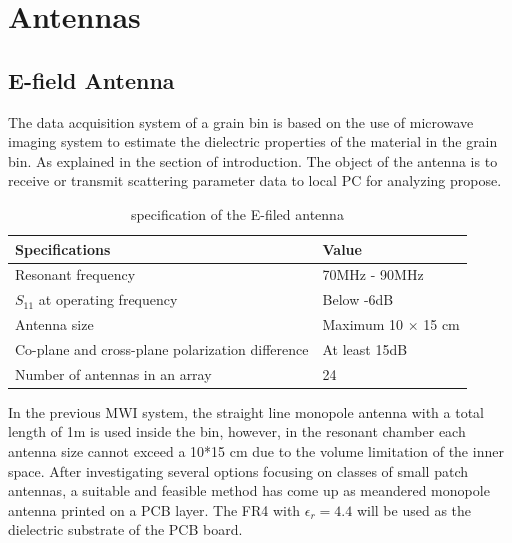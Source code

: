 
\chapter{Antennas}
\label{sec:Antennas}

\section{E-field Antenna}

The data acquisition system of a grain bin is based on the use of microwave imaging system to estimate the dielectric properties of the material in the grain bin. As explained in the section of introduction. The object of the antenna is to receive or transmit scattering parameter data to local PC for analyzing propose.

\begin{table}[h]
\centering
\caption{specification of the E-filed antenna}
\label{efield antenna specs}
\begin{tabular}{|l|l|}
\hline
Specifications                                   & Value              \\ \hline
Resonant frequency                               & 70MHz - 90MHz      \\ \hline
$S_{11}$ at operating frequency                       & Below -6dB         \\ \hline
Antenna size                                     & Maximum 10 $\times$ 15 cm \\ \hline
Co-plane and cross-plane polarization difference & At least 15dB      \\ \hline
Number of antennas in an array                   & 24                 \\ \hline
\end{tabular}
\end{table}

In the previous MWI system, the straight line monopole antenna with a total length of 1m is used inside the bin, however, in the resonant chamber each antenna size cannot exceed a 10*15 cm due to the volume limitation of the inner space. After investigating several options focusing on classes of small patch antennas, a suitable and feasible method has come up as meandered monopole antenna printed on a PCB layer. The FR4 with  $\epsilon_r = 4.4$ will be used as the dielectric substrate of the PCB board.

